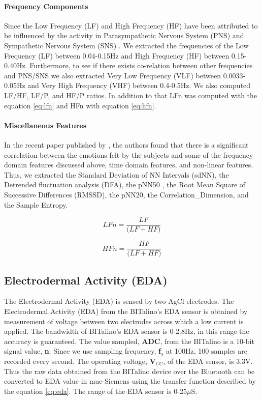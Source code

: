 \paragraph{Frequency Components} Since the Low Frequency (LF) and High Frequency (HF) have been attributed to be influenced by the activity in Parasympathetic Nervous System (PNS) and Sympathetic Nervous System (SNS) \cite{noauthor_heart_1996} \cite{berntson_gary:1997}. We extracted the frequencies of the Low Frequency (LF) between 0.04-0.15Hz and High Frequency (HF) between 0.15-0.40Hz. Furthermore, to see if there exists co-relation between other frequencies and PNS/SNS we also extracted Very Low Frequency (VLF) between 0.0033-0.05Hz and Very High Frequency (VHF) between 0.4-0.5Hz. We also computed LF/HF, LF/P, and HF/P ratios. In addition to that LFn was computed with the equation \ref{eq:lfn} and HFn with equation \ref{eq:hfn}. 

\paragraph{Miscellaneous Features} In the recent paper published by \citeauthor{zhao_emotion_2016}, the authors found that there is a significant correlation between the emotions felt by the subjects and some of the frequency domain features discussed above, time domain features, and non-linear features. Thus, we extracted the Standard Deviation of NN Intervals (sdNN), the Detrended fluctuation analysis (DFA), the pNN50 \cite{pend1995},  the Root Mean Square of Successive Differences (RMSSD), the pNN20, the Correlation\_Dimension, and the Sample Entropy. 

\begin{equation}
\label{eq:lfn}
    LFn = \frac{LF}{\big(LF + HF)}
\end{equation}

\begin{equation}
\label{eq:hfn}
    HFn = \frac{HF}{\big(LF + HF)}
\end{equation}

\subsection{Electrodermal Activity (EDA)}
\label{sec:eda_feature_extraction}
The Electrodermal Activity (EDA) is sensed by two AgCl electrodes. The Electrodermal Activity (EDA) from the BITalino's EDA sensor is obtained by measurement of voltage between two electrodes across which a low current is applied. The bandwidth of BITalino's EDA sensor is 0-2.8Hz, in this range the accuracy is guaranteed.  The value sampled, \textbf{ADC}, from the BITalino is a 10-bit signal value, \textbf{n}. Since we use sampling frequency, \textbf{f$_{s}$} at 100Hz, 100 samples are recorded every second. The operating voltage, \textbf{V$_{CC}$}, of the EDA sensor, is 3.3V. Thus the raw data obtained from the BITalino device over the Bluetooth can be converted to EDA value in mue-Siemens using the transfer function described by the equation \ref{eq:eda}. The range of the EDA sensor is 0-25$\mu$S. 


